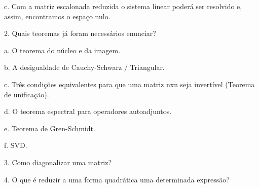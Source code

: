 \documentclass[
	article,			%
	11pt,				%
	oneside,			%
	a4paper,			%
	english,			%
	brazil,				%
	sumario=tradicional
	]{abntex2}
\begin{document}
c.    Com a matriz escalonada reduzida o sistema linear poderá ser resolvido e, assim, encontramos o espaço nulo.

2.    Quais teoremas já foram necessários enunciar?

a.    O teorema do núcleo e da imagem.

b.    A desigualdade de Cauchy-Schwarz / Triangular.

c.    Três condições equivalentes para que uma matriz nxn seja invertível (Teorema de unificação).

d.    O teorema espectral para operadores autoadjuntos.

e.    Teorema de Gren-Schmidt.

f.     SVD.

3.    Como diagonalizar uma matriz? 

4.    O que é reduzir a uma forma quadrática uma determinada expressão?

\end{document}
